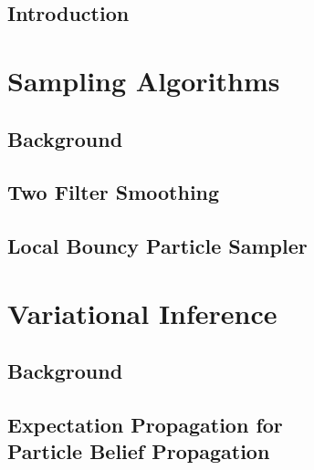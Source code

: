 


\doublespacing
\flushbottom

\chapter{Introduction}\setcounter{page}{1}

\ifintro\fi

\part{Sampling Algorithms} %

\chapter{Background}

\ifbgs\fi

\chapter{Two Filter Smoothing}

\iftfs\fi

\chapter{Local Bouncy Particle Sampler}

\iflbps\fi

\part{Variational Inference} %

\chapter{Background}

\ifbgm\fi

\chapter[EPBP]{Expectation Propagation for\\ Particle Belief Propagation}

